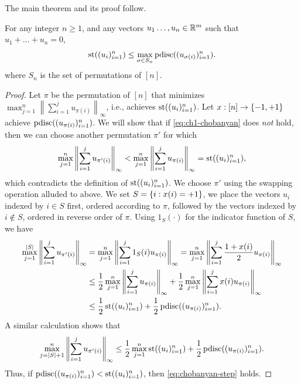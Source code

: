 The main theorem and its proof follow.
\begin{theorem}\label{thm:ch1-chobanyan}
  For any integer $n \ge 1$, and any
  vectors $u_1 \ldots, u_n \in \mathbb{R}^m$ such that $u_1 + \ldots + u_n = 0$, %
  \begin{equation}\label{eq:ch1-chobanyan}
    \operatorname{st}((u_i)_{i=1}^n)\le
    \max_{\sigma \in S_n} \operatorname{pdisc}((u_{\sigma(i)})_{i = 1}^n).
  \end{equation}
  where $S_n$ is the set of permutations of $[n]$.
\end{theorem}
\begin{proof}
  Let $\pi$ be the permutation of $[n]$ that minimizes $\max_{j = 1}^n\left\|\sum_{i = 1}^j u_{\pi(i)} \right\|_\infty$, i.e., achieves $\operatorname{st}((u_i)_{i=1}^n)$. Let
  $x:[n]\to\{-1,+1\}$ achieve $\operatorname{pdisc}((u_{\pi(i)})_{i = 1}^n)$. We
  will show that if \eqref{eq:ch1-chobanyan} does \emph{not} hold, then we can choose
  another permutation $\pi'$ for which 
  \begin{equation}\label{eq:chobanyan-step}
  \max_{j = 1}^n\left\|\sum_{i = 1}^j u_{\pi'(i)} \right\|_\infty
  < 
  \max_{j = 1}^n\left\|\sum_{i = 1}^j u_{\pi(i)} \right\|_\infty = \operatorname{st}((u_i)_{i=1}^n),
  \end{equation}
  which contradicts the definition of $\operatorname{st}((u_i)_{i=1}^n)$. We choose $\pi'$ using the
  swapping operation alluded to above. We set $S = \{i: x(i) = +1\}$, we place
  the vectors $u_i$ indexed by $i \in S$ first, ordered according to
  $\pi$, followed by the vectors indexed by $i \not \in S$, ordered in
  reverse order of $\pi$. Using $1_S(\cdot)$ for the indicator function of $S$, we have
  \begin{align*}
    \max_{j =1}^{|S|} \left\|\sum_{i = 1}^j u_{\pi'(i)} \right\|_\infty
    & =
    \max_{j=1}^n \left\|\sum_{i = 1}^j 1_S(i)u_{\pi(i)}  \right\|_\infty =
      \max_{j=1}^n \left\|\sum_{i = 1}^j \frac{1 + x(i)}{2} u_{\pi(i)}\right\|_\infty\\
    &\le
      \frac12\max_{j=1}^n \left\|\sum_{i = 1}^j u_{\pi(i)}\right\|_\infty
      +\frac12\max_{j=1}^n \left\|\sum_{i = 1}^j x(i)u_{\pi(i)}\right\|_\infty\\
    &\le 
      \frac12\operatorname{st}((u_i)_{i=1}^n)+ \frac12\operatorname{pdisc}((u_{\pi(i)})_{i = 1}^n).
  \end{align*}
  A similar calculation shows that
  \[
    \max_{j =|S| + 1}^n \left\|\sum_{i = 1}^j u_{\pi'(i)} \right\|_\infty
    \le
    \frac12\max_{j=1}^n \operatorname{st}((u_i)_{i=1}^n)   
    + \frac12\operatorname{pdisc}((u_{\pi(i)})_{i = 1}^n).  
  \]
  Thus, if \(\operatorname{pdisc}((u_{\pi(i)})_{i = 1}^n) < \operatorname{st}((u_i)_{i=1}^n)\), then \eqref{eq:chobanyan-step} holds. 
\end{proof}

